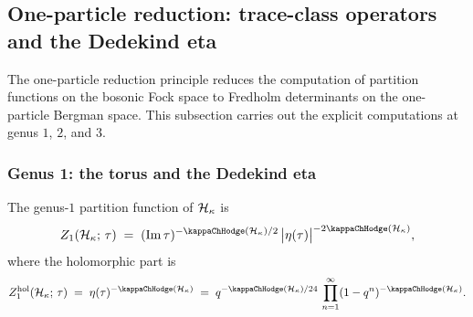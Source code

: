 %
%

\subsection{One-particle reduction: trace-class operators
and the Dedekind eta}

The one-particle reduction principle reduces the computation
of partition functions on the bosonic Fock space to Fredholm
determinants on the one-particle Bergman space. This subsection
carries out the explicit computations at genus $1$, $2$, and $3$.

\subsubsection{Genus 1: the torus and the Dedekind eta}

\begin{theorem}%
%
%
The genus-$1$ partition function of $\mathcal{H}_\kappa$ is
\begin{equation}%
Z_1(\cH_\kappa;\,\tau)
\;=\;
(\operatorname{Im}\tau)^{-\kappaChHodge(\cH_\kappa)/2}\,
\bigl|\dedeta(\tau)\bigr|^{-2\kappaChHodge(\cH_\kappa)},
\end{equation}
where the holomorphic part is
\begin{equation}%
Z_1^{\mathrm{hol}}(\cH_\kappa;\,\tau)
\;=\;
\dedeta(\tau)^{-\kappaChHodge(\cH_\kappa)}
\;=\;
q^{-\kappaChHodge(\cH_\kappa)/24}\,
\prod_{n=1}^{\infty}
(1 - q^n)^{-\kappaChHodge(\cH_\kappa)}.
\end{equation}
\end{theorem}

